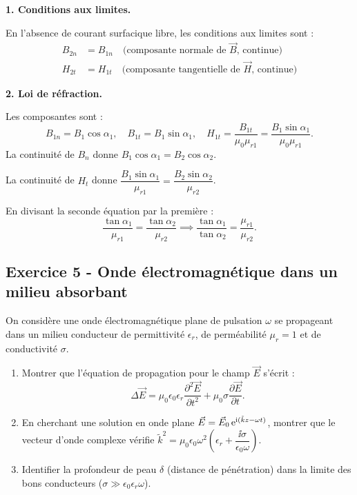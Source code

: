 \documentclass[12pt,a4paper]{article}
\begin{document}
\begin{boitecorrige}

\textbf{1. Conditions aux limites.}

En l'absence de courant surfacique libre, les conditions aux limites sont :
\begin{align*}
B_{2n} &= B_{1n} \quad\text{(composante normale de $\vec{B}$, continue)}\\
H_{2t} &= H_{1t} \quad\text{(composante tangentielle de $\vec{H}$, continue)}
\end{align*}

\textbf{2. Loi de réfraction.}

Les composantes sont :
\[
B_{1n} = B_1\cos\alpha_1,\quad B_{1t} = B_1\sin\alpha_1,\quad H_{1t} = \frac{B_{1t}}{\mu_0\mu_{r1}} = \frac{B_1\sin\alpha_1}{\mu_0\mu_{r1}}.
\]
La continuité de $B_n$ donne $B_1\cos\alpha_1 = B_2\cos\alpha_2$.

La continuité de $H_t$ donne $\dfrac{B_1\sin\alpha_1}{\mu_{r1}} = \dfrac{B_2\sin\alpha_2}{\mu_{r2}}$.

En divisant la seconde équation par la première :
\[
\frac{\tan\alpha_1}{\mu_{r1}} = \frac{\tan\alpha_2}{\mu_{r2}}
\implies \boxed{\frac{\tan\alpha_1}{\tan\alpha_2} = \frac{\mu_{r1}}{\mu_{r2}}.}
\]
\end{boitecorrige}

\subsection*{Exercice 5 - Onde électromagnétique dans un milieu absorbant \niveau{\difficile}}

\begin{boiteexercice}
On considère une onde électromagnétique plane de pulsation $\omega$ se propageant dans un milieu conducteur de permittivité $\epsilon_r$, de perméabilité $\mu_r = 1$ et de conductivité $\sigma$.
\begin{enumerate}
  \item Montrer que l'équation de propagation pour le champ $\vec{E}$ s'écrit :
  \[
    \Delta\vec{E} = \mu_0\epsilon_0\epsilon_r\frac{\partial^2\vec{E}}{\partial t^2} + \mu_0\sigma\frac{\partial\vec{E}}{\partial t}.
  \]
  \item En cherchant une solution en onde plane $\vec{E} = \vec{E}_0\,\mathrm{e}^{\mathrm{i}(\tilde{k}z-\omega t)}$, montrer que le vecteur d'onde complexe vérifie $\tilde{k}^2 = \mu_0\epsilon_0\omega^2\!\left(\epsilon_r + \dfrac{\ii\sigma}{\epsilon_0\omega}\right)$.
  \item Identifier la profondeur de peau $\delta$ (distance de pénétration) dans la limite des bons conducteurs ($\sigma\gg\epsilon_0\epsilon_r\omega$).
\end{enumerate}
\end{boiteexercice}
\end{document}
